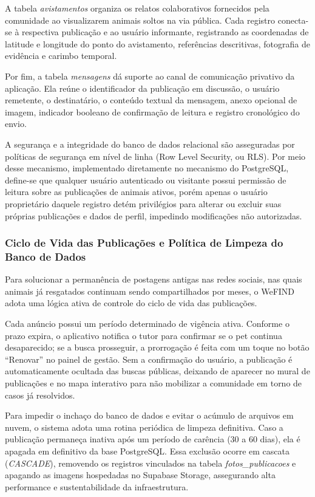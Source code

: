A tabela \textit{avistamentos} organiza os relatos colaborativos fornecidos pela comunidade ao visualizarem animais soltos na via pública. Cada registro conecta-se à respectiva publicação e ao usuário informante, registrando as coordenadas de latitude e longitude do ponto do avistamento, referências descritivas, fotografia de evidência e carimbo temporal.

Por fim, a tabela \textit{mensagens} dá suporte ao canal de comunicação privativo da aplicação. Ela reúne o identificador da publicação em discussão, o usuário remetente, o destinatário, o conteúdo textual da mensagem, anexo opcional de imagem, indicador booleano de confirmação de leitura e registro cronológico do envio.

A segurança e a integridade do banco de dados relacional são asseguradas por políticas de segurança em nível de linha (Row Level Security, ou RLS). Por meio desse mecanismo, implementado diretamente no mecanismo do PostgreSQL, define-se que qualquer usuário autenticado ou visitante possui permissão de leitura sobre as publicações de animais ativos, porém apenas o usuário proprietário daquele registro detém privilégios para alterar ou excluir suas próprias publicações e dados de perfil, impedindo modificações não autorizadas.

\subsubsection{Ciclo de Vida das Publicações e Política de Limpeza do Banco de Dados}

Para solucionar a permanência de postagens antigas nas redes sociais, nas quais animais já resgatados continuam sendo compartilhados por meses, o WeFIND adota uma lógica ativa de controle do ciclo de vida das publicações.

Cada anúncio possui um período determinado de vigência ativa. Conforme o prazo expira, o aplicativo notifica o tutor para confirmar se o pet continua desaparecido; se a busca prosseguir, a prorrogação é feita com um toque no botão ``Renovar'' no painel de gestão. Sem a confirmação do usuário, a publicação é automaticamente ocultada das buscas públicas, deixando de aparecer no mural de publicações e no mapa interativo para não mobilizar a comunidade em torno de casos já resolvidos.

Para impedir o inchaço do banco de dados e evitar o acúmulo de arquivos em nuvem, o sistema adota uma rotina periódica de limpeza definitiva. Caso a publicação permaneça inativa após um período de carência (30 a 60 dias), ela é apagada em definitivo da base PostgreSQL. Essa exclusão ocorre em cascata (\textit{CASCADE}), removendo os registros vinculados na tabela \textit{fotos\_publicacoes} e apagando as imagens hospedadas no Supabase Storage, assegurando alta performance e sustentabilidade da infraestrutura.

